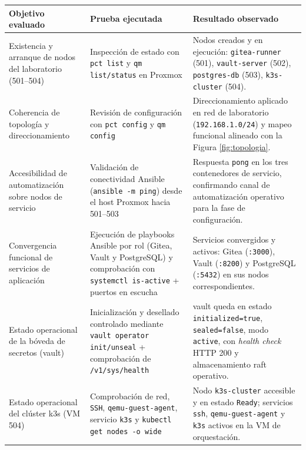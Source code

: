\documentclass[runningheads]{llncs}
\begin{document}
\begin{table}[H]
\centering
\small
\begin{tabular}{>{\raggedright\arraybackslash}p{} >{\raggedright\arraybackslash}p{} >{\raggedright\arraybackslash}p{}}
\toprule
\textbf{Objetivo evaluado} & \textbf{Prueba ejecutada} & \textbf{Resultado observado} \\
\midrule
Existencia y arranque de nodos del laboratorio (501--504) &
Inspección de estado con \texttt{pct list} y \texttt{qm list/status} en Proxmox &
Nodos creados y en ejecución: \texttt{gitea-runner} (501), \texttt{vault-server} (502), \texttt{postgres-db} (503), \texttt{k3s-cluster} (504). \\
\addlinespace
Coherencia de topología y direccionamiento &
Revisión de configuración con \texttt{pct config} y \texttt{qm config} &
Direccionamiento aplicado en red de laboratorio (\texttt{192.168.1.0/24}) y mapeo funcional alineado con la Figura \ref{fig:topologia}. \\
\addlinespace
Accesibilidad de automatización sobre nodos de servicio &
Validación de conectividad Ansible (\texttt{ansible -m ping}) desde el host Proxmox hacia 501--503 &
Respuesta \texttt{pong} en los tres contenedores de servicio, confirmando canal de automatización operativo para la fase de configuración. \\
\addlinespace
Convergencia funcional de servicios de aplicación &
Ejecución de playbooks Ansible por rol (Gitea, Vault y PostgreSQL) y comprobación con \texttt{systemctl is-active} + puertos en escucha &
Servicios convergidos y activos: Gitea (\texttt{:3000}), Vault (\texttt{:8200}) y PostgreSQL (\texttt{:5432}) en sus nodos correspondientes. \\
\addlinespace
Estado operacional de la bóveda de secretos (\gls{vault}) &
Inicialización y desellado controlado mediante \texttt{vault operator init/unseal} + comprobación de \texttt{/v1/sys/health} &
\gls{vault} queda en estado \texttt{initialized=true}, \texttt{sealed=false}, modo \texttt{active}, con \textit{health check} HTTP 200 y almacenamiento \gls{raft} operativo. \\
\addlinespace
Estado operacional del clúster \gls{k3s} (VM 504) &
Comprobación de red, \texttt{SSH}, \texttt{qemu-guest-agent}, servicio \texttt{k3s} y \texttt{kubectl get nodes -o wide} &
Nodo \texttt{k3s-cluster} accesible y en estado \texttt{Ready}; servicios \texttt{ssh}, \texttt{qemu-guest-agent} y \texttt{k3s} activos en la VM de orquestación. \\

\end{tabular}
\end{table}
\end{document}
